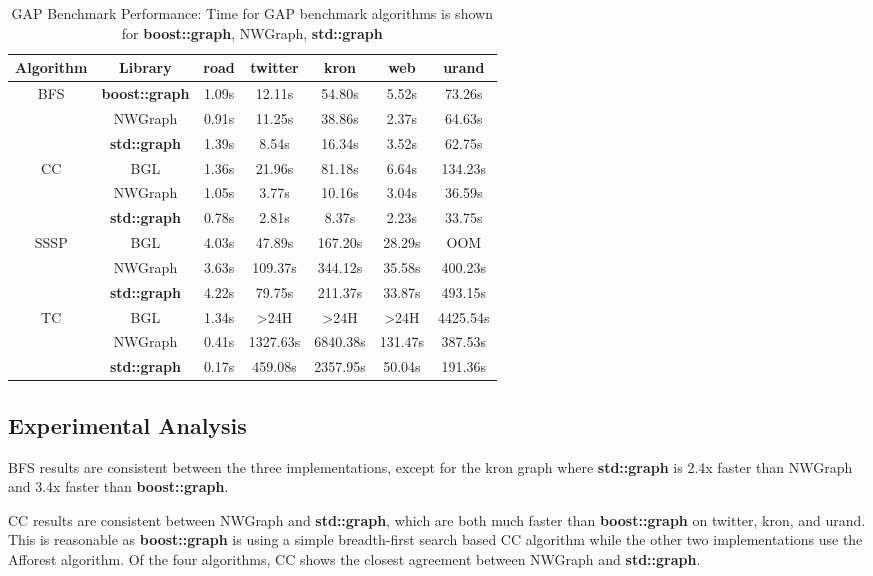 \begin{table}[h!]
\centering
\begin{tabular}{ c c c c c c c }
Algorithm & Library & road & twitter & kron & web & urand \\
\hline
\multirow{3}{*}{BFS} & \textbf{boost::graph} & 1.09s & 12.11s & 54.80s & 5.52s & 73.26s \\
& NWGraph & 0.91s & 11.25s & 38.86s & 2.37s & 64.63s \\
& \textbf{std::graph} & 1.39s & 8.54s & 16.34s & 3.52s & 62.75s \\
\hline
\multirow{3}{*}{CC} & BGL & 1.36s & 21.96s & 81.18s & 6.64s & 134.23s \\
& NWGraph & 1.05s & 3.77s & 10.16s & 3.04s & 36.59s \\
& \textbf{std::graph} & 0.78s & 2.81s & 8.37s & 2.23s & 33.75s \\
\hline
\multirow{3}{*}{SSSP} & BGL & 4.03s & 47.89s & 167.20s & 28.29s & OOM \\
& NWGraph & 3.63s & 109.37s & 344.12s & 35.58s & 400.23s \\
& \textbf{std::graph} & 4.22s & 79.75s & 211.37s & 33.87s & 493.15s \\
\hline
\multirow{3}{*}{TC} & BGL & 1.34s & >24H & >24H & >24H & 4425.54s \\
& NWGraph & 0.41s & 1327.63s & 6840.38s & 131.47s & 387.53s \\
& \textbf{std::graph} & 0.17s & 459.08s & 2357.95s & 50.04s & 191.36s \\
\hline
\end{tabular}
\caption{GAP Benchmark Performance: Time for GAP benchmark algorithms is shown for \textbf{boost::graph}, NWGraph, \textbf{std::graph}}
\label{tab:performance_numbers}
\end{table}

\subsection{Experimental Analysis}
BFS results are consistent between the three implementations,
except for the kron graph where \textbf{std::graph} is 2.4x faster
than NWGraph and 3.4x faster than \textbf{boost::graph}.

CC results are consistent between NWGraph and \textbf{std::graph}, which
are both much faster than \textbf{boost::graph} on twitter, kron, and urand.
This is reasonable as \textbf{boost::graph} is using a simple breadth-first
search based CC algorithm while the other two implementations use the
Afforest algorithm.
Of the four algorithms, CC shows the closest agreement between NWGraph
and \textbf{std::graph}.

